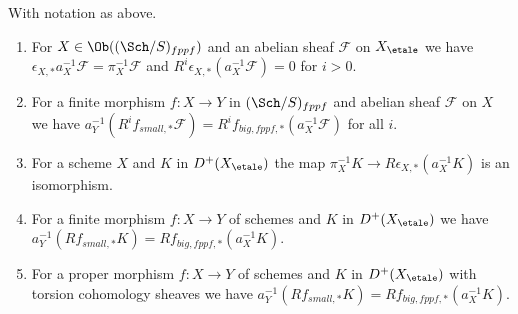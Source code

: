\begin{lemma}
\label{lemma-V-C-all-n-etale-fppf}
With notation as above.
\begin{enumerate}
\item For $X \in \Ob((\Sch/S)_{fppf})$ and an abelian sheaf $\mathcal{F}$
on $X_\etale$ we have
$\epsilon_{X, *}a_X^{-1}\mathcal{F} = \pi_X^{-1}\mathcal{F}$
and $R^i\epsilon_{X, *}(a_X^{-1}\mathcal{F}) = 0$ for $i > 0$.
\item For a finite morphism $f : X \to Y$ in $(\Sch/S)_{fppf}$
and abelian sheaf $\mathcal{F}$ on $X$ we have
$a_Y^{-1}(R^if_{small, *}\mathcal{F}) =
R^if_{big, fppf, *}(a_X^{-1}\mathcal{F})$
for all $i$.
\item For a scheme $X$ and $K$ in $D^+(X_\etale)$ the map
$\pi_X^{-1}K \to R\epsilon_{X, *}(a_X^{-1}K)$ is an isomorphism.
\item For a finite morphism $f : X \to Y$ of schemes
and $K$ in $D^+(X_\etale)$ we have
$a_Y^{-1}(Rf_{small, *}K) = Rf_{big, fppf, *}(a_X^{-1}K)$.
\item For a proper morphism $f : X \to Y$ of schemes
and $K$ in $D^+(X_\etale)$ with torsion cohomology sheaves we have
$a_Y^{-1}(Rf_{small, *}K) = Rf_{big, fppf, *}(a_X^{-1}K)$.
\end{enumerate}
\end{lemma}

